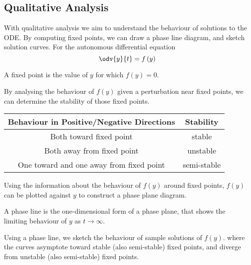 \documentclass{article}
\begin{document}
\subsection{Qualitative Analysis}
With qualitative analysis we aim to understand the behaviour of
solutions to the ODE\@. By \linebreak computing fixed points, we can
draw a phase line diagram, and sketch solution curves. For the
autonomous differential equation
\begin{equation*}
    \odv{y}{t} = f\left( y \right)
\end{equation*}
\begin{definition}
    A fixed point is the value of \(y\) for which \(f\left( y \right) = 0\).
\end{definition}
\begin{definition}[Stability]
    By analysing the behaviour of \(f\left( y \right)\) given a perturbation near
    fixed points, we can determine the stability of those fixed points.
    \begin{table}[H]
        \centering
        \begin{tabular}{c c}
            \toprule
            \textbf{Behaviour in Positive/Negative Directions} & \textbf{Stability} \\
            \midrule
            Both toward fixed point                            & stable             \\
            Both away from fixed point                         & unstable           \\
            One toward and one away from fixed point           & semi-stable        \\
            \bottomrule
        \end{tabular}
    \end{table}
\end{definition}
\begin{definition}
    Using the information about the behaviour of \(f\left( y \right)\) around fixed
    points, \(f\left( y \right)\) can be plotted against \(y\) to construct a phase
    plane diagram.
\end{definition}
\begin{definition}
    A phase line is the one-dimensional form of a phase plane, that
    shows the limiting behaviour of \(y\) as \(t \to \infty\).
\end{definition}
\begin{definition}
    Using a phase line, we sketch the behaviour of sample solutions of
    \(f\left( y \right)\). where the curves asymptote toward stable (also
    semi-stable) fixed points, and diverge from unstable (also
    semi-stable) fixed points.
\end{definition}
\newpage
\end{document}

